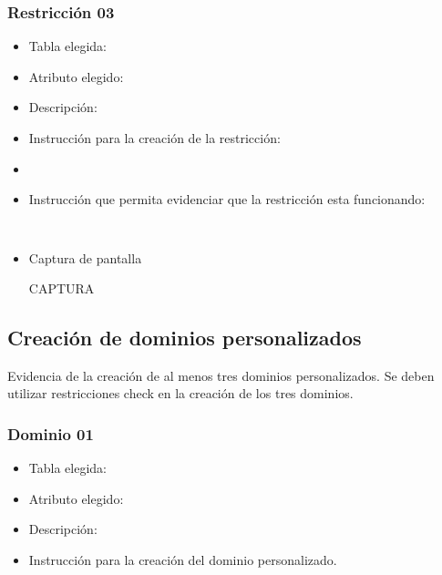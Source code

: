 \subsubsection*{Restricción 03}

\begin{itemize} 
  \item Tabla elegida: 
  \item Atributo elegido: 
  \item Descripción: 
  \item Instrucción para la creación de la restricción: 
  \item 
    \begin{verbatim} 
    
    \end{verbatim} 

  \item Instrucción que permita evidenciar que la restricción esta funcionando: 
  
    \begin{verbatim} 
    
    \end{verbatim} 

  \item Captura de pantalla 
  
    \begin{center} 
      CAPTURA
    \end{center} 

\end{itemize}


\subsection{Creación de dominios personalizados}

Evidencia de la creación de al menos tres dominios personalizados. Se deben utilizar restricciones check en la creación de los tres dominios.

\subsubsection*{Dominio 01}

\begin{itemize}
    \item Tabla elegida: 
    \item Atributo elegido: 
    \item Descripción: 
    \item Instrucción para la creación del dominio personalizado.
    \begin{lstlisting}[caption={Tablas para la BdDatos}, label={lst:sql_estadios}]
    
    \end{lstlisting}
\end{itemize}


